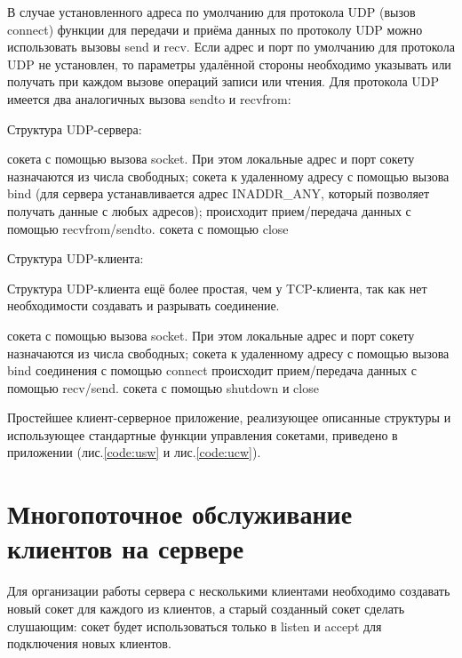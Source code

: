 В случае установленного адреса по умолчанию для протокола UDP (вызов connect) функции для передачи и приёма данных по протоколу UDP можно использовать вызовы send и recv. Если адрес и порт по умолчанию для протокола UDP не установлен, то параметры удалённой стороны необходимо указывать или получать при каждом вызове операций записи или чтения. Для протокола UDP имеется два аналогичных вызова sendto и recvfrom:


\parindent=1cm


Структура UDP-сервера:
\vspace{3mm}

\begin{enumerate}
 сокета с помощью вызова socket. При этом локальные адрес и порт сокету назначаются из числа свободных;  
 сокета к удаленному адресу с помощью вызова bind (для сервера устанавливается адрес INADDR\_ANY, который позволяет получать данные с любых адресов); 
 происходит прием/передача данных с помощью recvfrom/sendto.
 сокета с помощью close
\end{enumerate}

Структура UDP-клиента:
\vspace{3mm}

Структура UDP-клиента ещё более простая, чем у TCP-клиента, так как нет необходимости создавать и разрывать соединение.


\begin{enumerate}
 сокета с помощью вызова socket. При этом локальные адрес и порт сокету назначаются из числа свободных;  
 сокета к удаленному адресу с помощью вызова bind
 соединения с помощью connect
 происходит прием/передача данных с помощью recv/send.
 сокета с помощью shutdown и close
\end{enumerate}

Простейшее клиент-серверное приложение, реализующее описанные структуры и использующее стандартные функции управления сокетами, приведено в приложении (лис.\ref{code:usw} и лис.\ref{code:ucw}).

\section{Многопоточное обслуживание клиентов на сервере}

Для организации работы сервера с несколькими клиентами необходимо создавать новый сокет для каждого из клиентов, а старый созданный сокет сделать слушающим: сокет будет использоваться только в listen и accept для подключения новых клиентов. 

